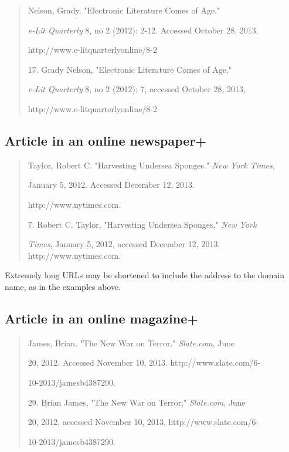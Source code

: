 \begin{quote}

Nelson, Grady. "Electronic Literature Comes of Age." 

\hspace{.4in}\emph{e-Lit Quarterly} 8, no 2 (2012): 2-12. Accessed October 28, 2013. 

\hspace{.4in}http://www.e-litquarterlyonline/8-2

\medskip

\hspace{.4in}17. Grady Nelson, "Electronic Literature Comes of Age,"  

\emph{e-Lit Quarterly} 8, no 2 (2012): 7, accessed October 28, 2013, 

http://www.e-litquarterlyonline/8-2

\end{quote}

\subsection{Article in an online newspaper+}

\begin{quote}

Taylor, Robert C. "Harvesting Undersea Sponges." \emph{New York Times}, 

\hspace{.4in}January 5, 2012. Accessed December 12, 2013. 

\hspace{.4in}http://www.nytimes.com.

\medskip

\hspace{.4in}7. Robert C. Taylor, "Harvesting Undersea Sponges," \emph{New York}

 \emph{Times}, January 5, 2012, accessed December 12, 2013. http://www.nytimes.com.

\end{quote}

 Extremely long URLs may be shortened to include the address to the domain name,
as in the examples above.

\subsection{Article in an online magazine+}

\begin{quote}
James, Brian. "The New War on Terror." \emph{Slate.com}, June

\hspace{.4in}20, 2012. Accessed November 10, 2013. http://www.slate.com/6-

\hspace{.4in}10-2013/jamesb4387290.

\medskip

\hspace{.4in}29. Brian James, "The New War on Terror," \emph{Slate.com}, June

20, 2012, accessed November 10, 2013, http://www.slate.com/6-

10-2013/jamesb4387290.
\end{quote}


